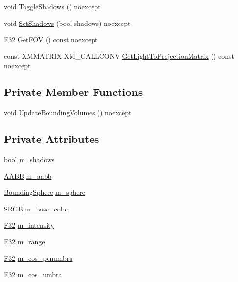 \begin{DoxyCompactItemize}
void \hyperlink{classmage_1_1rendering_1_1_spot_light_a4e6412e05d894a97409c23d8d088cabf}{Toggle\+Shadows} () noexcept
\item 
void \hyperlink{classmage_1_1rendering_1_1_spot_light_af1f1d3aee8bdcda50d16f4b0551e4728}{Set\+Shadows} (bool shadows) noexcept
\item 
\hyperlink{namespacemage_aa97e833b45f06d60a0a9c4fc22ae02c0}{F32} \hyperlink{classmage_1_1rendering_1_1_spot_light_a22527d940bc7601285429b36e8d97490}{Get\+F\+OV} () const noexcept
\item 
const X\+M\+M\+A\+T\+R\+IX X\+M\+\_\+\+C\+A\+L\+L\+C\+O\+NV \hyperlink{classmage_1_1rendering_1_1_spot_light_ad617d1c098e2ca222a9736b8c45fa0c8}{Get\+Light\+To\+Projection\+Matrix} () const noexcept
\end{DoxyCompactItemize}
\subsection*{Private Member Functions}
\begin{DoxyCompactItemize}
\item 
void \hyperlink{classmage_1_1rendering_1_1_spot_light_aa225a105edf22a1a430a1c3aa42bc490}{Update\+Bounding\+Volumes} () noexcept
\end{DoxyCompactItemize}
\subsection*{Private Attributes}
\begin{DoxyCompactItemize}
\item 
bool \hyperlink{classmage_1_1rendering_1_1_spot_light_aa2e1e955cf9fb12a9e064cc523cbbe26}{m\+\_\+shadows}
\item 
\hyperlink{classmage_1_1_a_a_b_b}{A\+A\+BB} \hyperlink{classmage_1_1rendering_1_1_spot_light_a8d79d322ce7d394d4de201478350d795}{m\+\_\+aabb}
\item 
\hyperlink{classmage_1_1_bounding_sphere}{Bounding\+Sphere} \hyperlink{classmage_1_1rendering_1_1_spot_light_a24667e6bec37a402627c20283795de95}{m\+\_\+sphere}
\item 
\hyperlink{structmage_1_1_s_r_g_b}{S\+R\+GB} \hyperlink{classmage_1_1rendering_1_1_spot_light_a79bbd00a892a19738361a52ed875f906}{m\+\_\+base\+\_\+color}
\item 
\hyperlink{namespacemage_aa97e833b45f06d60a0a9c4fc22ae02c0}{F32} \hyperlink{classmage_1_1rendering_1_1_spot_light_af91b9fc5303e5c2c5e90337f42db015c}{m\+\_\+intensity}
\item 
\hyperlink{namespacemage_aa97e833b45f06d60a0a9c4fc22ae02c0}{F32} \hyperlink{classmage_1_1rendering_1_1_spot_light_a83027e02fbeee3ee5698ebb498ff30be}{m\+\_\+range}
\item 
\hyperlink{namespacemage_aa97e833b45f06d60a0a9c4fc22ae02c0}{F32} \hyperlink{classmage_1_1rendering_1_1_spot_light_afcac44663ee8e8773eaa838ddbf9c0f2}{m\+\_\+cos\+\_\+penumbra}
\item 
\hyperlink{namespacemage_aa97e833b45f06d60a0a9c4fc22ae02c0}{F32} \hyperlink{classmage_1_1rendering_1_1_spot_light_a2152cbea4f216f8ae18550a8c9e5b5e0}{m\+\_\+cos\+\_\+umbra}
\end{DoxyCompactItemize}
